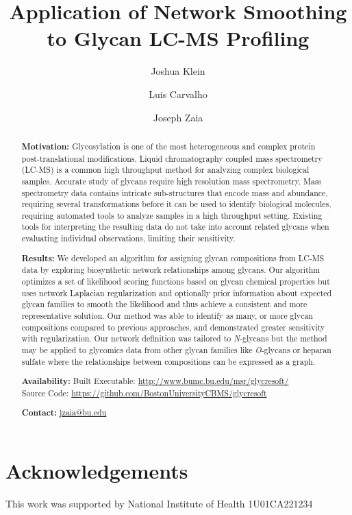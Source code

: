 \documentclass{article}
\title{Application of Network Smoothing to Glycan LC-MS Profiling}
\author[1]{Joshua Klein}
\author[1,2]{Luis Carvalho}
\author[1,3]{Joseph Zaia}
\affil[1]{Program for Bioinformatics, Boston University}
\affil[2]{Department of Math and Statistics, Boston University}
\affil[3]{Department of Biochemistry, Boston University}
\newcommand{\nglycans}[0]{\textit{N}-glycans\xspace}
\begin{document}
\maketitle

\begin{abstract}
\textbf{Motivation:} Glycosylation is one of the most heterogeneous
and complex protein post-translational modifications. Liquid chromatography
coupled mass spectrometry (LC-MS) is a common high throughput method for
analyzing complex biological samples. Accurate study of glycans require
high resolution mass spectrometry. Mass spectrometry data contains
intricate sub-structures that encode mass and abundance, requiring several
transformations before it can be used to identify biological molecules,
requiring automated tools to analyze samples in a high throughput setting.
Existing tools for interpreting the resulting data do not take into account
related glycans when evaluating individual observations, limiting their sensitivity.

\textbf{Results:} We developed an algorithm for assigning glycan compositions
from LC-MS data by exploring biosynthetic network relationships among glycans.
Our algorithm optimizes a set of likelihood scoring functions based on glycan
chemical properties but uses network Laplacian regularization and optionally
prior information about expected glycan families to smooth the likelihood and
thus achieve a consistent and more representative solution. Our method was able
to identify as many, or more glycan compositions compared to previous approaches,
and demonstrated greater sensitivity with regularization. Our network definition
was tailored to \nglycans but the method may be applied to glycomics data from
other glycan families like \textit{O}-glycans or heparan sulfate where the
relationships between compositions can be expressed as a graph.

\textbf{Availability:}
    Built Executable: \href{http://www.bumc.bu.edu/msr/glycresoft/}{http://www.bumc.bu.edu/msr/glycresoft/} \\
    Source Code: \href{https://github.com/BostonUniversityCBMS/glycresoft}{
    https://github.com/BostonUniversityCBMS/glycresoft}

\textbf{Contact:}
    \href{mailto:jzaia@bu.edu}{jzaia@bu.edu}
\end{abstract}










\section{Acknowledgements}
    This work was supported by National Institute of Health 1U01CA221234




\end{document}
